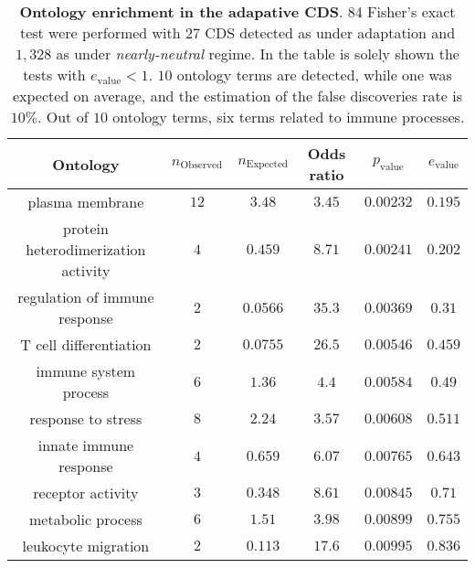 \documentclass{article}
\begin{document}
\begin{table*}[hb!]
   \centering
   \begin{adjustbox}{width = 1\textwidth}
	   \small\begin{tabular}{|c|c|c|c|c|c|}
				 \hline
				 Ontology & $n_{\mathrm{Observed}}$ & $n_{\mathrm{Expected}}$ & Odds ratio & $p_{\mathrm{value}}$ & $e_{\mathrm{value}}$		\\
				 \hline
				 plasma membrane & $12$ & $3.48$ & $3.45$ & $0.00232$ & $0.195$ \\
				 protein heterodimerization activity & $4$ & $0.459$ & $8.71$ & $0.00241$ & $0.202$  \\
				 regulation of immune response & $2$ & $0.0566$ & $35.3$ & $0.00369$ & $0.31$ \\
				 T cell differentiation & $2$ & $0.0755$ & $26.5$ & $0.00546$ & $0.459$  \\
				 immune system process & $6$ & $1.36$ & $4.4$ & $0.00584$ & $0.49$  \\
				 response to stress & $8$ & $2.24$ & $3.57$ & $0.00608$ & $0.511$  \\
				 innate immune response & $4$ & $0.659$ & $6.07$ & $0.00765$ & $0.643$  \\
				 receptor activity & $3$ & $0.348$ & $8.61$ & $0.00845$ & $0.71$  \\
				 metabolic process & $6$ & $1.51$ & $3.98$ & $0.00899$ & $0.755$	 \\
				 leukocyte migration & $2$ & $0.113$ & $17.6$ & $0.00995$ & $0.836$  \\
				 \hline
	   \end{tabular}
   \end{adjustbox}
   \caption{\textbf{Ontology enrichment in the adapative CDS}.
   84 Fisher's exact test were performed with $27$ CDS detected as under adaptation and $1,328$ as under \textit{nearly-neutral} regime.
   In the table is solely shown the tests with $e_{\mathrm{value}} < 1$.
	   $10$ ontology terms are detected, while one was expected on average, and the estimation of the false discoveries rate is $10\%$.
	   Out of $10$ ontology terms, six terms related to immune processes.
	   \label{fig:ontology}}
\end{table*}
\end{document}
